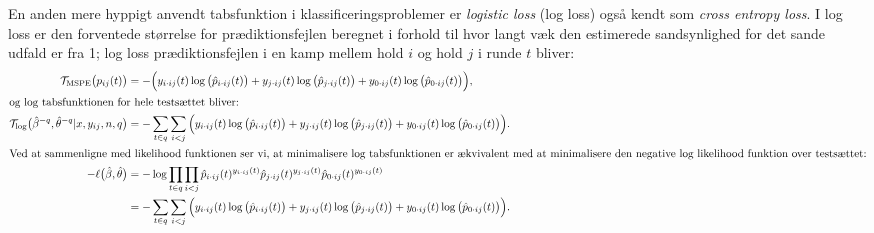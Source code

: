 \documentclass[11pt,a4paper]{article}
\begin{document}
En anden mere hyppigt anvendt tabsfunktion i klassificeringsproblemer er \textit{logistic loss} (log loss) også kendt som \textit{cross entropy loss}. I log loss er den forventede størrelse for prædiktionsfejlen beregnet i forhold til hvor langt væk den estimerede sandsynlighed for det sande udfald er fra 1; log loss prædiktionsfejlen i en kamp mellem hold $i$ og hold $j$ i runde $t$ bliver:
\begin{align*}
    \mathcal{T}_{\text{MSPE}}\big{(}p_{ij}(t)\big{)}&=-\Big{(}y_{i\cdot ij}(t)\log\big{(}\hat{p}_{i\cdot ij}(t)\big{)}+y_{j\cdot ij}(t)\log\big{(}\hat{p}_{j\cdot ij}(t)\big{)}+y_{0\cdot ij}(t)\log\big{(}\hat{p}_{0\cdot ij}(t)\big{)}\Big{)},\\
\intertext{og log tabsfunktionen for hele testsættet bliver:}
\mathcal{T}_{\log}\big{(}\hat{\beta}^{-q},\hat{\theta}^{-q}|x,y_{ij},n,q\big{)}&=-\sum_{t\in q}\sum_{i<j}\Big{(}y_{i\cdot ij}(t)\log\big{(}\hat{p}_{i\cdot ij}(t)\big{)}+y_{j\cdot ij}(t)\log\big{(}\hat{p}_{j\cdot ij}(t)\big{)}+y_{0\cdot ij}(t)\log\big{(}\hat{p}_{0\cdot ij}(t)\big{)}\Big{)}.\\
\intertext{Ved at sammenligne med likelihood funktionen ser vi, at minimalisere log tabsfunktionen er ækvivalent med at minimalisere den negative log likelihood funktion over testsættet:}
-\ell\big{(}\hat{\beta},\hat{\theta}\big{)}&=-\log\prod_{t\in q}\prod_{i<j}\hat{p}_{i\cdot ij}(t)^{y_{i\cdot ij}(t)}\hat{p}_{j\cdot ij}(t)^{y_{j\cdot ij}(t)}\hat{p}_{0\cdot ij}(t)^{y_{0\cdot ij}(t)}\\
&=-\sum_{t\in q}\sum_{i<j}\Big{(}y_{i\cdot ij}(t)\log\big{(}\hat{p}_{i\cdot ij}(t)\big{)}+y_{j\cdot ij}(t)\log\big{(}\hat{p}_{j\cdot ij}(t)\big{)}+y_{0\cdot ij}(t)\log\big{(}\hat{p}_{0\cdot ij}(t)\big{)}\Big{)}.
\end{align*}
\end{document}
